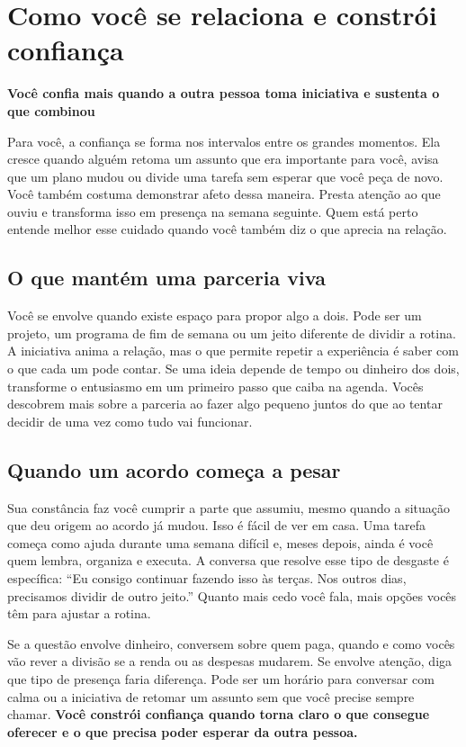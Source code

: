 \documentclass[11pt,a4paper]{article}
\newcommand{\subtituloleitura}[1]{\textbf{#1}\par\nopagebreak[4]}
\begin{document}
\clearpage
\section*{Como você se relaciona e constrói confiança}
\subtituloleitura{Você confia mais quando a outra pessoa toma iniciativa e sustenta o que combinou}

Para você, a confiança se forma nos intervalos entre os grandes momentos. Ela cresce quando alguém retoma um assunto que era importante para você, avisa que um plano mudou ou divide uma tarefa sem esperar que você peça de novo. Você também costuma demonstrar afeto dessa maneira. Presta atenção ao que ouviu e transforma isso em presença na semana seguinte. Quem está perto entende melhor esse cuidado quando você também diz o que aprecia na relação.

\subsection*{O que mantém uma parceria viva}

Você se envolve quando existe espaço para propor algo a dois. Pode ser um projeto, um programa de fim de semana ou um jeito diferente de dividir a rotina. A iniciativa anima a relação, mas o que permite repetir a experiência é saber com o que cada um pode contar. Se uma ideia depende de tempo ou dinheiro dos dois, transforme o entusiasmo em um primeiro passo que caiba na agenda. Vocês descobrem mais sobre a parceria ao fazer algo pequeno juntos do que ao tentar decidir de uma vez como tudo vai funcionar.

\subsection*{Quando um acordo começa a pesar}

Sua constância faz você cumprir a parte que assumiu, mesmo quando a situação que deu origem ao acordo já mudou. Isso é fácil de ver em casa. Uma tarefa começa como ajuda durante uma semana difícil e, meses depois, ainda é você quem lembra, organiza e executa. A conversa que resolve esse tipo de desgaste é específica: “Eu consigo continuar fazendo isso às terças. Nos outros dias, precisamos dividir de outro jeito.” Quanto mais cedo você fala, mais opções vocês têm para ajustar a rotina.

Se a questão envolve dinheiro, conversem sobre quem paga, quando e como vocês vão rever a divisão se a renda ou as despesas mudarem. Se envolve atenção, diga que tipo de presença faria diferença. Pode ser um horário para conversar com calma ou a iniciativa de retomar um assunto sem que você precise sempre chamar. \textbf{Você constrói confiança quando torna claro o que consegue oferecer e o que precisa poder esperar da outra pessoa.}
\end{document}
